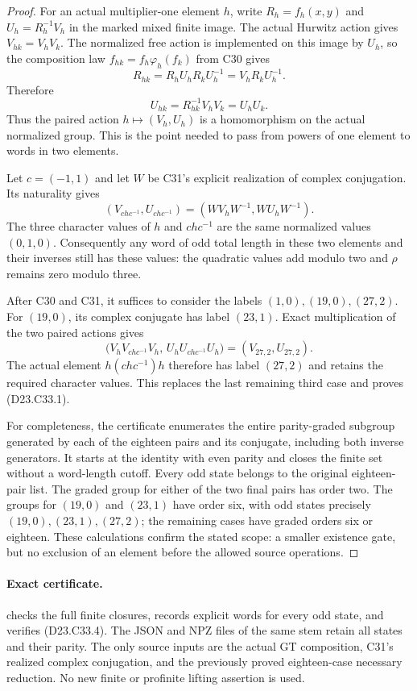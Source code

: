 \begin{proof}
For an actual multiplier-one element $h$, write
$R_h=f_h(x,y)$ and $U_h=R_h^{-1}V_h$ in the marked
mixed finite image.  The actual Hurwitz action gives
$V_{hk}=V_hV_k$.  The normalized free action is implemented
on this image by $U_h$, so the composition law
$f_{hk}=f_h\varphi_h(f_k)$ from C30 gives
\[
 R_{hk}=R_hU_hR_kU_h^{-1}
        =V_hR_kU_h^{-1}.
\]
Therefore
\[
                    U_{hk}=R_{hk}^{-1}V_hV_k=U_hU_k.
                                                               \tag{D23.C33.2}
\]
Thus the paired action $h\mapsto(V_h,U_h)$ is a
homomorphism on the actual normalized group.  This is
the point needed to pass from powers of one element
to words in two elements.

Let $c=(-1,1)$ and let $W$ be C31's explicit realization
of complex conjugation.  Its naturality gives
\[
 (V_{chc^{-1}},U_{chc^{-1}})
       =(WV_hW^{-1},WU_hW^{-1}).                          \tag{D23.C33.3}
\]
The three character values of $h$ and $chc^{-1}$ are
the same normalized values $(0,1,0)$.  Consequently any
word of odd total length in these two elements and
their inverses still has these values: the quadratic
values add modulo two and $\rho$ remains zero modulo
three.

After C30 and C31, it suffices to consider the labels
$(1,0),(19,0),(27,2)$.  For $(19,0)$, its complex
conjugate has label $(23,1)$.  Exact multiplication
of the two paired actions gives
\[
 \bigl(V_hV_{chc^{-1}}V_h,\,
       U_hU_{chc^{-1}}U_h\bigr)
                    =(V_{27,2},U_{27,2}).                 \tag{D23.C33.4}
\]
The actual element $h(chc^{-1})h$ therefore has
label $(27,2)$ and retains the required character
values.  This replaces the last remaining third
case and proves (D23.C33.1).

For completeness, the certificate enumerates the
entire parity-graded subgroup generated by each of
the eighteen pairs and its conjugate, including
both inverse generators.  It starts at the identity
with even parity and closes the finite set without
a word-length cutoff.  Every odd state belongs
to the original eighteen-pair list.  The graded
group for either of the two final pairs has order
two.  The groups for $(19,0)$ and $(23,1)$ have
order six, with odd states precisely
$(19,0),(23,1),(27,2)$; the remaining cases have
graded orders six or eighteen.  These calculations
confirm the stated scope: a smaller existence
gate, but no exclusion of an element before the
allowed source operations.
\end{proof}

\paragraph{Exact certificate.}
checks the full finite closures, records explicit words
for every odd state, and verifies (D23.C33.4).
The JSON and NPZ files of the same stem retain
all states and their parity.  The only source inputs
are the actual GT composition, C31's realized
complex conjugation, and the previously proved
eighteen-case necessary reduction.  No new finite
or profinite lifting assertion is used.

